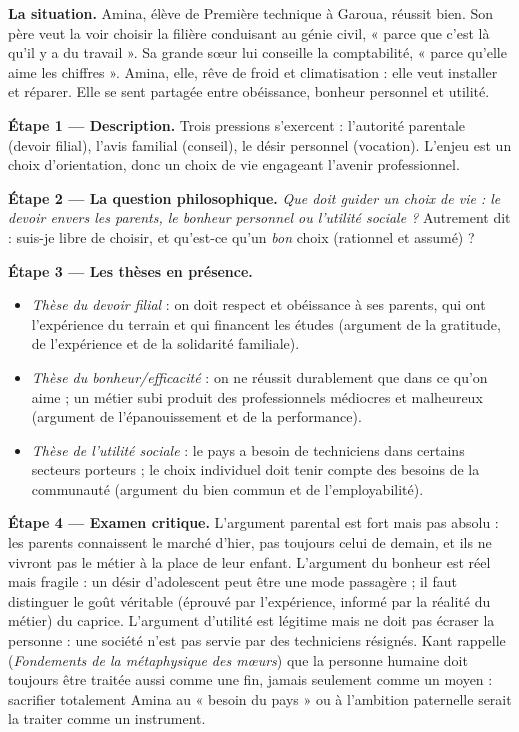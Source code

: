 \documentclass[11pt]{article}
\newcommand{\cle}[1]{{\popxbold\color{popdark}#1}}
\begin{document}
\textbf{La situation.} Amina, élève de Première technique à Garoua, réussit bien. Son père veut la voir choisir la filière conduisant au génie civil, « parce que c'est là qu'il y a du travail ». Sa grande sœur lui conseille la comptabilité, « parce qu'elle aime les chiffres ». Amina, elle, rêve de froid et climatisation : elle veut installer et réparer. Elle se sent partagée entre obéissance, bonheur personnel et utilité.

\textbf{Étape 1 — Description.} Trois pressions s'exercent : l'autorité parentale (devoir filial), l'avis familial (conseil), le désir personnel (vocation). L'enjeu est un choix d'orientation, donc un choix de vie engageant l'avenir professionnel.

\textbf{Étape 2 — La question philosophique.} \emph{Que doit guider un choix de vie : le devoir envers les parents, le bonheur personnel ou l'utilité sociale ?} Autrement dit : suis-je \cle{libre} de choisir, et qu'est-ce qu'un \emph{bon} choix (rationnel et assumé) ?

\textbf{Étape 3 — Les thèses en présence.}
\begin{itemize}
\item \emph{Thèse du devoir filial} : on doit respect et obéissance à ses parents, qui ont l'expérience du terrain et qui financent les études (argument de la gratitude, de l'expérience et de la solidarité familiale).
\item \emph{Thèse du bonheur/efficacité} : on ne réussit durablement que dans ce qu'on aime ; un métier subi produit des professionnels médiocres et malheureux (argument de l'épanouissement et de la performance).
\item \emph{Thèse de l'utilité sociale} : le pays a besoin de techniciens dans certains secteurs porteurs ; le choix individuel doit tenir compte des besoins de la communauté (argument du bien commun et de l'employabilité).
\end{itemize}

\textbf{Étape 4 — Examen critique.} L'argument parental est fort mais pas absolu : les parents connaissent le marché d'hier, pas toujours celui de demain, et ils ne vivront pas le métier à la place de leur enfant. L'argument du bonheur est réel mais fragile : un désir d'adolescent peut être une mode passagère ; il faut distinguer le goût véritable (éprouvé par l'expérience, informé par la réalité du métier) du caprice. L'argument d'utilité est légitime mais ne doit pas écraser la personne : une société n'est pas servie par des techniciens résignés. Kant rappelle (\emph{Fondements de la métaphysique des mœurs}) que la personne humaine doit toujours être traitée aussi comme une fin, jamais seulement comme un moyen : sacrifier totalement Amina au « besoin du pays » ou à l'ambition paternelle serait la traiter comme un instrument.
\end{document}

